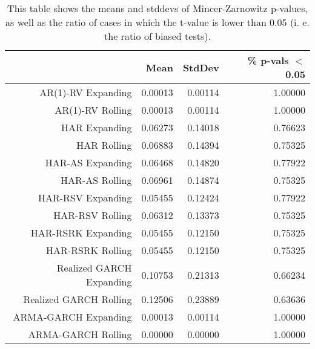 \begin{table}[ht]
\centering
\begin{tabular}{rrrr}
  \hline
 & Mean & StdDev & \% p-vals $<$0.05 \\ 
  \hline
AR(1)-RV Expanding & 0.00013 & 0.00114 & 1.00000 \\ 
  AR(1)-RV Rolling & 0.00013 & 0.00114 & 1.00000 \\ 
  HAR Expanding & 0.06273 & 0.14018 & 0.76623 \\ 
  HAR Rolling & 0.06883 & 0.14394 & 0.75325 \\ 
  HAR-AS Expanding & 0.06468 & 0.14820 & 0.77922 \\ 
  HAR-AS Rolling & 0.06961 & 0.14874 & 0.75325 \\ 
  HAR-RSV Expanding & 0.05455 & 0.12424 & 0.77922 \\ 
  HAR-RSV Rolling & 0.06312 & 0.13373 & 0.75325 \\ 
  HAR-RSRK Expanding & 0.05455 & 0.12150 & 0.75325 \\ 
  HAR-RSRK Rolling & 0.05455 & 0.12150 & 0.75325 \\ 
  Realized GARCH Expanding & 0.10753 & 0.21313 & 0.66234 \\ 
  Realized GARCH Rolling & 0.12506 & 0.23889 & 0.63636 \\ 
  ARMA-GARCH Expanding & 0.00013 & 0.00114 & 1.00000 \\ 
  ARMA-GARCH Rolling & 0.00000 & 0.00000 & 1.00000 \\ 
   \hline
\end{tabular}
\caption[Mincer-Zarnowitz p-values]{This table shows the means and stddevs of Mincer-Zarnowitz p-values, as well as the ratio of cases in which the t-value is lower than 0.05 (i. e. the ratio of biased tests). } 
\label{Table:MZpvals}
\end{table}
